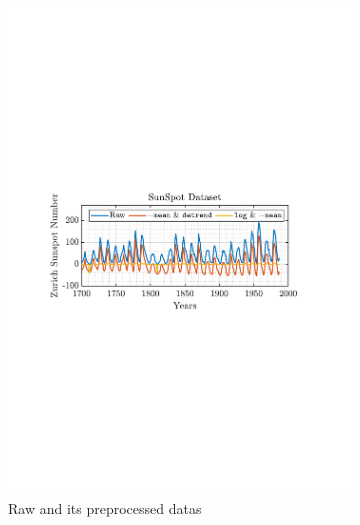 \documentclass[12pt]{article}
\numberwithin{equation}{section}
\begin{document}
	\begin{figure}[H]
		\centering
		\begin{subfigure}{0.49\textwidth}
			\centering
			\includegraphics[trim={2.2cm 11.2cm 3.15cm  11.2cm}, clip, width=\textwidth]{../MATLAB/figures/q1_2a_fig01.pdf} 
			\captionsetup{justification=centering}
			\caption{Raw and its preprocessed datas}
		\end{subfigure}
		\begin{subfigure}{0.49\textwidth}
			\centering

\end{subfigure}
\end{figure}
\end{document}
